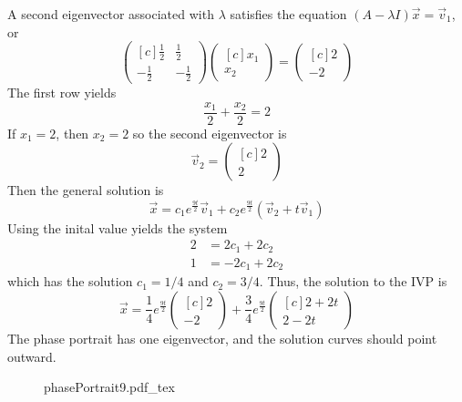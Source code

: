 \documentclass[11pt, titlepage]{article}
\begin{document}
\begin{enumerate}
\begin{solution}
\begin{equation*}
      \end{equation*}
      A second eigenvector associated with \(\lambda\) satisfies the equation \((A - \lambda I) \vec{x} = \vec{v}_{1}\), or
      \begin{equation*}
        \begin{pmatrix*}[c]
          \frac{1}{2} & \frac{1}{2} \\
          -\frac{1}{2} & -\frac{1}{2}
        \end{pmatrix*}
        \begin{pmatrix*}[c]
          x_{1} \\
          x_{2}
        \end{pmatrix*} =
        \begin{pmatrix*}[c]
          2 \\
          -2
        \end{pmatrix*}
      \end{equation*}
      The first row yields
      \begin{equation*}
        \frac{x_{1}}{2} + \frac{x_{2}}{2} = 2
      \end{equation*}
      If \(x_{1} = 2\), then \(x_{2} = 2\) so the second eigenvector is
      \begin{equation*}
        \vec{v}_{2} =
        \begin{pmatrix*}[c]
          2 \\
          2
        \end{pmatrix*}
      \end{equation*}
      Then the general solution is
      \begin{equation*}
        \vec{x} = c_{1} e^{\frac{9t}{2}} \vec{v}_{1} + c_{2} e^{\frac{9t}{2}} (\vec{v}_{2} + t \vec{v}_{1})
      \end{equation*}
      Using the inital value yields the system
      \begin{align*}
        2 &= 2 c_{1} + 2 c_{2} \\
        1 &= -2 c_{1} + 2 c_{2}
      \end{align*}
      which has the solution \(c_{1} = 1/4\) and \(c_{2} = 3/4\).
      Thus, the solution to the IVP is
      \begin{equation*}
        \vec{x} = \frac{1}{4} e^{\frac{9t}{2}}
        \begin{pmatrix*}[c]
          2 \\
          -2
        \end{pmatrix*} + \frac{3}{4} e^{\frac{9t}{2}}
        \begin{pmatrix*}[c]
          2 + 2t \\
          2 - 2t
        \end{pmatrix*}
      \end{equation*}
      The phase portrait has one eigenvector, and the solution curves should point outward.
      \begin{figure}[h]
        \centering
        \def\svgwidth{0.9\columnwidth}
        {phasePortrait9.pdf_tex}
      \end{figure}


\end{solution}
\end{enumerate}
\end{document}
